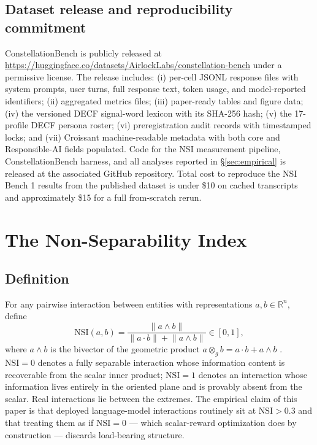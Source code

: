\documentclass{article}
\begin{document}
\subsection{Dataset release and reproducibility commitment}
\label{sec:dataset:release}
ConstellationBench is publicly released at \url{https://huggingface.co/datasets/AirlockLabs/constellation-bench} under a permissive license. The release includes: (i) per-cell JSONL response files with system prompts, user turns, full response text, token usage, and model-reported identifiers; (ii) aggregated metrics files; (iii) paper-ready tables and figure data; (iv) the versioned DECF signal-word lexicon with its SHA-256 hash; (v) the 17-profile DECF persona roster; (vi) preregistration audit records with timestamped locks; and (vii) Croissant machine-readable metadata with both core and Responsible-AI fields populated. Code for the NSI measurement pipeline, ConstellationBench harness, and all analyses reported in \S\ref{sec:empirical} is released at the associated GitHub repository. Total cost to reproduce the NSI Bench 1 results from the published dataset is under \$10 on cached transcripts and approximately \$15 for a full from-scratch rerun.

\section{The Non-Separability Index}
\label{sec:nsi}

\subsection{Definition}
For any pairwise interaction between entities with representations $a, b \in \mathbb{R}^n$, define
\[
\mathrm{NSI}(a, b) = \frac{\lVert a \wedge b \rVert}{\lVert a \cdot b \rVert + \lVert a \wedge b \rVert} \in [0,1],
\]
where $a \wedge b$ is the bivector of the geometric product $a \otimes_g b = a \cdot b + a \wedge b$ \citep{brehmer2023geometric}. $\mathrm{NSI} = 0$ denotes a fully separable interaction whose information content is recoverable from the scalar inner product; $\mathrm{NSI} = 1$ denotes an interaction whose information lives entirely in the oriented plane and is provably absent from the scalar. Real interactions lie between the extremes. The empirical claim of this paper is that deployed language-model interactions routinely sit at $\mathrm{NSI} > 0.3$ and that treating them as if $\mathrm{NSI} = 0$ --- which scalar-reward optimization does by construction --- discards load-bearing structure.
\end{document}
